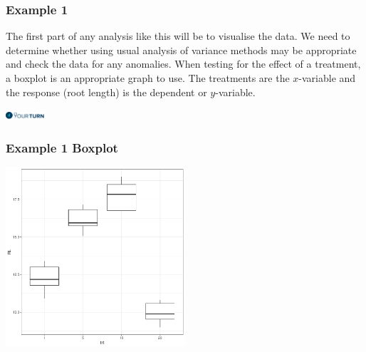 \begin{frame}\frametitle{Example 1}

The first part of any analysis like this will be to visualise the data. We need to determine whether using usual
analysis of variance methods may be appropriate and check the data for any anomalies. When testing for the effect of a
treatment, a boxplot is an appropriate graph to use. The treatments are the $x$-variable and the response (root length)
is the dependent or $y$-variable.


\vspace{3cm}
\flushright
\includegraphics[height = 0.3cm]{yourturn}

\end{frame}



\begin{frame}\frametitle{Example 1 Boxplot}
\includegraphics[width=0.5\textwidth]{example1_boxplot.pdf}
\end{frame}


